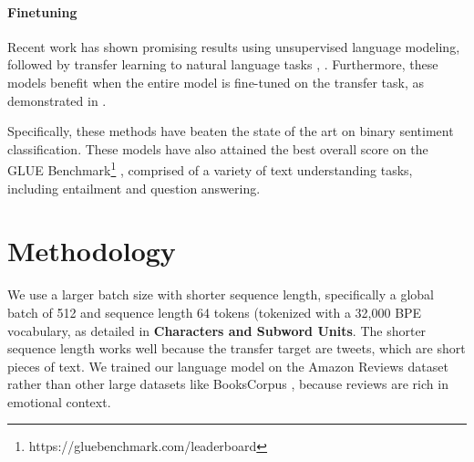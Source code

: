 \documentclass[letterpaper]{article} \usepackage{aaai19}  \usepackage{times}  \usepackage{helvet}  \usepackage{courier}  \usepackage{url}  \usepackage{graphicx}  \usepackage{booktabs}
\begin{document}
\begin{table}[ht]
\caption{Inter-rater agreement. Humans don't always agree, even on binary sentiment.}
\label{table:rater-agreement}
\end{table}

\paragraph{Finetuning}
Recent work has shown promising results using unsupervised language modeling, followed by transfer learning to natural language tasks \protect\cite{Radford2017}, \protect\cite{Radford2018}. Furthermore, these models benefit when the entire model is fine-tuned on the transfer task, as demonstrated in \protect\cite{Howard2018}. 

Specifically, these methods have beaten the state of the art on binary sentiment classification. These models have also attained the best overall score on the GLUE Benchmark\footnote{https://gluebenchmark.com/leaderboard} \protect\cite{GLUE2018}, comprised of a variety of text understanding tasks, including entailment and question answering.


\section{Methodology}
We use a larger batch size with shorter sequence length, specifically a global batch of 512 and sequence length 64 tokens (tokenized with a 32,000 BPE vocabulary, as detailed in \textbf{Characters and Subword Units}. The shorter sequence length works well because the transfer target are tweets, which are short pieces of text.  We trained our language model on the Amazon Reviews dataset \protect\cite{McAuley2015} rather than other large datasets like BooksCorpus \protect\cite{BooksCorpus2015}, because reviews are rich in emotional context. 
\end{document}
